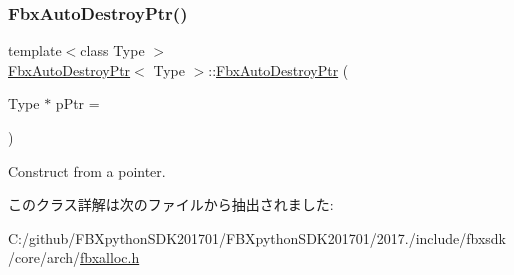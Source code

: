 \subsubsection{\texorpdfstring{Fbx\+Auto\+Destroy\+Ptr()}{FbxAutoDestroyPtr()}}
{\footnotesize\ttfamily template$<$class Type $>$ \\
\hyperlink{class_fbx_auto_destroy_ptr}{Fbx\+Auto\+Destroy\+Ptr}$<$ Type $>$\+::\hyperlink{class_fbx_auto_destroy_ptr}{Fbx\+Auto\+Destroy\+Ptr} (\begin{DoxyParamCaption}\item[{Type $\ast$}]{p\+Ptr = {} }\end{DoxyParamCaption})\hspace{0.3cm}{\ttfamily [explicit]}}



Construct from a pointer. 



このクラス詳解は次のファイルから抽出されました\+:\begin{DoxyCompactItemize}
\item 
C\+:/github/\+F\+B\+Xpython\+S\+D\+K201701/\+F\+B\+Xpython\+S\+D\+K201701/2017./include/fbxsdk/core/arch/\hyperlink{fbxalloc_8h}{fbxalloc.\+h}\end{DoxyCompactItemize}
